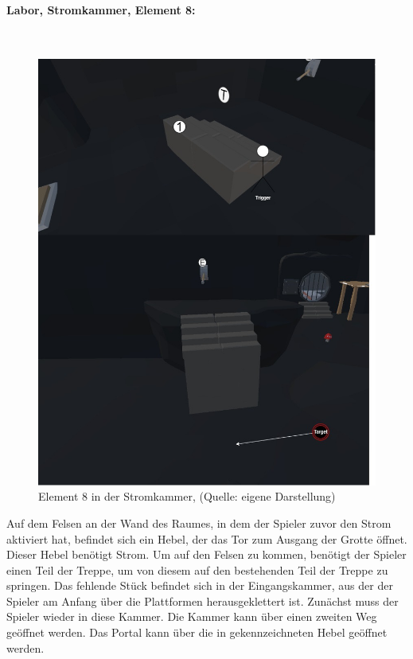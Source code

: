 \paragraph{Labor, Stromkammer, Element 8:}\label{p:lse8}
~
\begin{figure}[ht]
\centering
\includegraphics[width=0.8\linewidth]{content/pictures/Raetsel-L02_R01_R08.jpg}
\caption{Element 8 in der Stromkammer, (Quelle: eigene Darstellung)}
\label{fig:L02_R01_R08}
\end{figure}

Auf dem Felsen an der Wand des Raumes, in dem der Spieler zuvor den Strom aktiviert hat, befindet sich ein Hebel, der das Tor zum Ausgang der Grotte öffnet. Dieser Hebel benötigt Strom. Um auf den Felsen zu kommen, benötigt der Spieler einen Teil der Treppe, um von diesem auf den bestehenden Teil der Treppe zu springen. Das fehlende Stück befindet sich in der Eingangskammer, aus der der Spieler am Anfang über die Plattformen herausgeklettert ist. Zunächst muss der Spieler wieder in diese Kammer. Die Kammer kann über einen zweiten Weg geöffnet werden. Das Portal kann über die in  gekennzeichneten Hebel geöffnet werden.

\newpage
